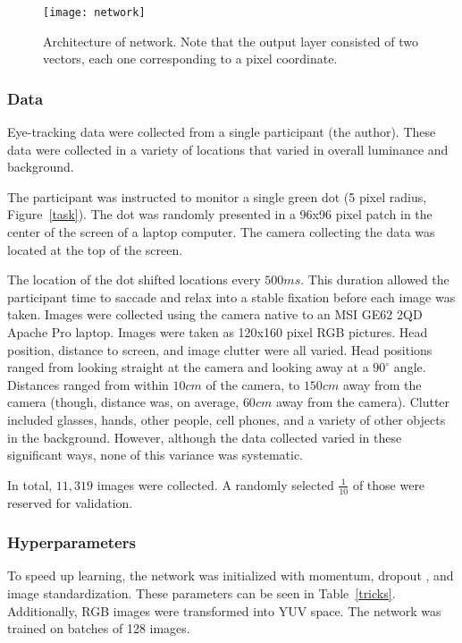 \documentclass[10pt,letterpaper]{article}
\begin{document}
\begin{figure}[t]
\texttt{[image: network]}
\caption{Architecture of network. Note that the output layer consisted of two vectors, each one corresponding to a pixel coordinate.} 
\label{model}
\centering
\end{figure}

\subsubsection{Data}

Eye-tracking data were collected from a single participant (the author). These data were collected in a variety of locations that varied in overall luminance and background. 

The participant was instructed to monitor a single green dot (5 pixel radius, Figure~\ref{task}). The dot was randomly presented in a 96x96 pixel patch in the center of the screen of a laptop computer. The camera collecting the data was located at the top of the screen.

The location of the dot shifted locations every $500ms$. This duration allowed the participant time to saccade and relax into a stable fixation before each image was taken. Images were collected using the camera native to an MSI GE62 2QD Apache Pro laptop. Images were taken as 120x160 pixel RGB pictures. Head position, distance to screen, and image clutter were all varied. Head positions ranged from looking straight at the camera and looking away at a $90^{\circ}$ angle. Distances ranged from within $10cm$ of the camera, to $150cm$ away from the camera (though, distance was, on average, $60cm$ away from the camera). Clutter included glasses, hands, other people, cell phones, and a variety of other objects in the background. However, although the data collected varied in these significant ways, none of this variance was systematic. 

In total, $11,319$ images were collected. A randomly selected $\frac{1}{10}$ of those were reserved for validation.

\subsubsection{Hyperparameters}

To speed up learning, the network was initialized with momentum, dropout \cite{srivastava2014dropout}, and image standardization. These parameters can be seen in Table~\ref{tricks}. Additionally, RGB images were transformed into YUV space. The network was trained on batches of 128 images.
\end{document}

